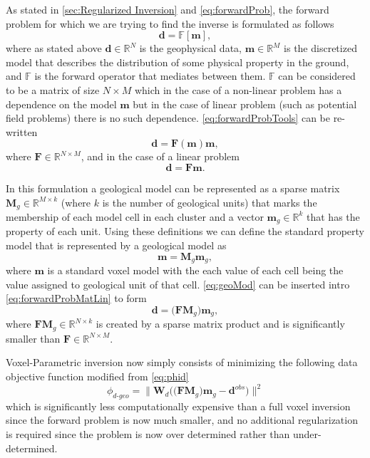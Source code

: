 As stated in \autoref{sec:Regularized Inversion} and \autoref{eq:forwardProb}, the forward problem for which we are trying to find the inverse is formulated as follows
\begin{equation}
\mathbf d = \mathbb F [\mathbf m], \label{eq:forwardProbTools}
\end{equation}
where as stated above $\mathbf d \in \mathbb R^N$ is the geophysical data, $\mathbf m \in \mathbb R^M$ is the discretized model that describes the distribution of some physical property in the ground, and $\mathbb F$ is the forward operator that mediates between them. $\mathbb F$ can be considered to be a matrix of size $N\times M$ which in the case of a non-linear problem has a dependence on the model $\mathbf m$ but in the case of linear problem (such as potential field problems) there is no such dependence. \autoref{eq:forwardProbTools} can be re-written
\begin{equation}
\mathbf d = \mathbf F(\mathbf m)\mathbf m, \label{eq:forwardProbMat}
\end{equation}
where $\mathbf F \in \mathbb R^{N\times M}$, and in the case of a linear problem
\begin{equation}
\mathbf d = \mathbf F\mathbf m. \label{eq:forwardProbMatLin}
\end{equation}

In this formulation a geological model can be represented as a sparse matrix $\mathbf{M}_g \in \mathbb R^{M\times k}$ (where $k$ is the number of geological units) that marks the membership of each model cell in each cluster and a vector $\mathbf m_g \in \mathbb R^{k}$ that has the property of each unit. Using these definitions we can define the standard property model that is represented by a geological model as
\begin{equation}
\mathbf m = \mathbf M_g\mathbf m_g, \label{eq:geoMod}
\end{equation}
where $\mathbf m$ is a standard voxel model with the each value of each cell being the value assigned to geological unit of that cell. \autoref{eq:geoMod} can be inserted intro \autoref{eq:forwardProbMatLin} to form 
\begin{equation}
\mathbf d = \big(\mathbf F\mathbf M_g\big)\mathbf m_g, \label{eq:forwardProbMatLinGeo}
\end{equation}
where $\mathbf F\mathbf M_g \in \mathbb R^{N\times k}$ is created by a sparse matrix product and is significantly smaller than $\mathbf F \in \mathbb R^{N\times M}$.

Voxel-Parametric inversion now simply consists of minimizing the following data objective function modified from \autoref{eq:phid}
\begin{equation}
\phi_{d\text{-}geo} =\|\mathbf W_d\Big(\big(\mathbf F\mathbf M_g\big)\mathbf m_g - \mathbf d^{obs}\Big)\|^2
\end{equation}
\label{eq:phidGeo}
which is significantly less computationally expensive than a full voxel inversion since the forward problem is now much smaller, and no additional regularization is required since the problem is now over determined rather than under-determined.


